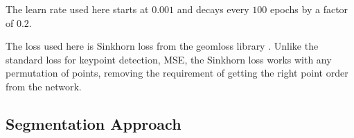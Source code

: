 \documentclass[10pt]{book}
\newcommand{\figureref}[1]{\autoref{#1}}
\begin{document}
The learn rate used here starts at $0.001$ and decays every $100$ epochs by a factor of $0.2$. 


The loss used here is Sinkhorn loss from the geomloss library \cite{feydy2019interpolating}. Unlike the standard loss for keypoint detection, \ac{MSE}, the Sinkhorn loss works with any permutation of points, removing the requirement of getting the right point order from the network. 

\subsection{Segmentation Approach}
\end{document}
